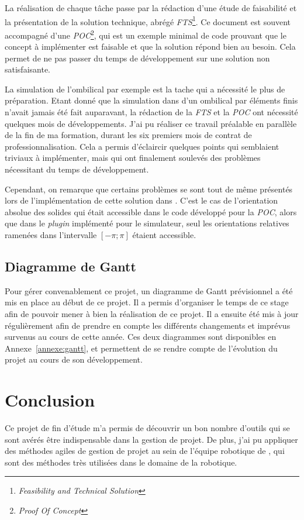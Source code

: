 			La réalisation de chaque tâche passe par la rédaction d'une étude de faisabilité et la présentation de la solution technique, abrégé \textit{FTS}\footnote{\textit{Feasibility and Technical Solution}}. Ce document est souvent accompagné d'une \textit{POC}\footnote{\textit{Proof Of Concept}}, qui est un exemple minimal de code prouvant que le concept à implémenter est faisable et que la solution répond bien au besoin. Cela permet de ne pas passer du temps de développement sur une solution non satisfaisante.

			La simulation de l'ombilical par exemple est la tache qui a nécessité le plus de préparation. Etant donné que la simulation dans \gazebo{} d'un ombilical par éléments finis n'avait jamais été fait auparavant, la rédaction de la \textit{FTS} et la \textit{POC} ont nécessité quelques mois de développements. J'ai pu réaliser ce travail préalable en parallèle de la fin de ma formation, durant les six premiers mois de contrat de professionnalisation. Cela a permis d'éclaircir quelques points qui semblaient triviaux à implémenter, mais qui ont finalement soulevés des problèmes nécessitant du temps de développement. 
			
			Cependant, on remarque que certains problèmes se sont tout de même présentés lors de l'implémentation de cette solution dans \gazebo{}. C'est le cas de l'orientation absolue des solides qui était accessible dans le code développé pour la \textit{POC}, alors que dans le \textit{plugin} implémenté pour le simulateur, seul les orientations relatives ramenées dans l'intervalle $[-\pi; \pi]$ étaient accessible.

		\subsection{Diagramme de Gantt}
			
			Pour gérer convenablement ce projet, un diagramme de Gantt prévisionnel a été mis en place au début de ce projet. Il a permis d'organiser le temps de ce stage afin de pouvoir mener à bien la réalisation de ce projet. Il a ensuite été mis à jour régulièrement afin de prendre en compte les différents changements et imprévus survenus au cours de cette année. Ces deux diagrammes sont disponibles en Annexe~\ref{annexe:gantt}, et permettent de se rendre compte de l'évolution du projet au cours de son développement.

	\section{Conclusion}
	
		Ce projet de fin d'étude m'a permis de découvrir un bon nombre d'outils qui se sont avérés être indispensable dans la gestion de projet. De plus, j'ai pu appliquer des méthodes agiles de gestion de projet au sein de l'équipe robotique de \forssea{}, qui sont des méthodes très utilisées dans le domaine de la robotique.